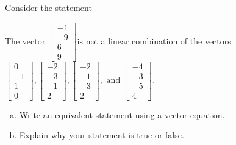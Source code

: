
\begin{exerciseStatement}


Consider the statement 
\begin{center}\begin{minipage}{0.8\textwidth}
 The vector \( \left[\begin{array}{c}
-1 \\
-9 \\
6 \\
9
\end{array}\right] \)is not a linear combination of the vectors \( \left[\begin{array}{c}
0 \\
-1 \\
1 \\
0
\end{array}\right] , \left[\begin{array}{c}
-2 \\
-3 \\
-1 \\
2
\end{array}\right] , \left[\begin{array}{c}
-2 \\
-1 \\
-3 \\
2
\end{array}\right] , \text{ and } \left[\begin{array}{c}
-4 \\
-3 \\
-5 \\
4
\end{array}\right] \). 
\end{minipage}\end{center}
    


\begin{enumerate}[(a)]
\item  Write an equivalent statement using a vector equation.
\item  Explain why your statement is true or false.
\end{enumerate}
    
\end{exerciseStatement}
    
